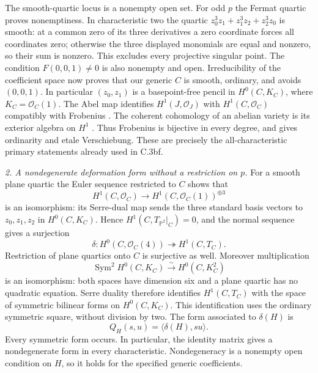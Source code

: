 The smooth-quartic locus is a nonempty open set. For odd $p$ the
Fermat quartic proves nonemptiness. In characteristic two the quartic
$z_0^3z_1+z_1^3z_2+z_2^3z_0$ is smooth: at a common zero of its
three derivatives a zero coordinate forces all coordinates zero;
otherwise the three displayed monomials are equal and nonzero, so
their sum is nonzero. This excludes every projective singular point.
The condition $F(0,0,1)\ne0$ is also nonempty and open. Irreducibility
of the coefficient space now proves that our generic $C$ is smooth,
ordinary, and avoids $(0,0,1)$. In particular $(z_0,z_1)$ is a
basepoint-free pencil in $H^0(C,K_C)$, where $K_C=\mathcal O_C(1)$.
The Abel map identifies $H^1(J,\mathcal O_J)$ with
$H^1(C,\mathcal O_C)$ compatibly with Frobenius
\citep[Lemma9.5, pp.~31--32]{D_MilneJacobians2021}.
The coherent cohomology of an abelian variety is its exterior algebra
on $H^1$ \citep[Theorem1.1, p.~1]{D_BrionCoherent2012}.
Thus Frobenius is bijective in every degree, and
\citet[Lemma2.3.1 and Proposition2.3.2, p.~12]{D_HaconPatakfalvi2014v2}
gives ordinarity and etale Verschiebung. These are precisely the
all-characteristic primary statements already used in C.3bf.

\emph{2. A nondegenerate deformation form without a restriction on $p$.}
For a smooth plane quartic the Euler sequence restricted to $C$
shows that
\[
 H^1(C,\mathcal O_C)\longrightarrow
 H^1(C,\mathcal O_C(1))^{\oplus3}
\]
is an isomorphism: its Serre-dual map sends the three standard
basis vectors to $z_0,z_1,z_2$ in $H^0(C,K_C)$. Hence
$H^1(C,T_{\mathbb P^2}|_C)=0$, and the normal sequence gives a
surjection
\[
 \delta:H^0(C,\mathcal O_C(4))\twoheadrightarrow H^1(C,T_C).
\]
Restriction of plane quartics onto $C$ is surjective as well.
Moreover multiplication
\[
 \operatorname{Sym}^2 H^0(C,K_C)
       \xrightarrow{\ \sim\ }H^0(C,K_C^2)
\]
is an isomorphism: both spaces have dimension six and a plane
quartic has no quadratic equation. Serre duality therefore identifies
$H^1(C,T_C)$ with the space of symmetric bilinear forms on
$H^0(C,K_C)$. This identification uses the ordinary symmetric square,
without division by two. The form associated to $\delta(H)$ is
\[
 Q_H(s,u)=\langle\delta(H),su\rangle.
\]
Every symmetric form occurs. In particular, the identity matrix gives
a nondegenerate form in every characteristic. Nondegeneracy is a nonempty open
condition on $H$, so it holds for the specified generic coefficients.

